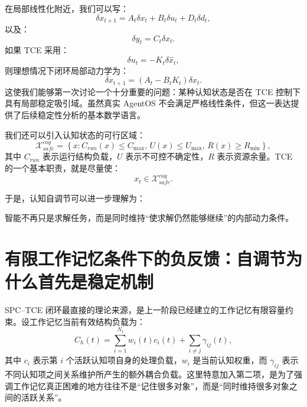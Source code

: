 在局部线性化附近，我们可以写：
\begin{equation}
\delta x_{t+1}
=
A_t\delta x_t
+
B_t\delta u_t
+
D_t\delta d_t,
\end{equation}
以及：
\begin{equation}
\delta y_t
=
C_t\delta x_t.
\end{equation}
如果 TCE 采用：
\begin{equation}
\delta u_t
=
-K_t\delta\hat{x}_t,
\end{equation}
则理想情况下闭环局部动力学为：
\begin{equation}
\delta x_{t+1}
=
(A_t-B_tK_t)
\delta x_t.
\end{equation}
这使我们能够第一次讨论一个十分重要的问题：某种认知状态是否在 TCE 控制下具有局部稳定吸引域。虽然真实 AgentOS 不会满足严格线性条件，但这一表达提供了后续稳定性分析的基本数学语言。

我们还可以引入认知状态的可行区域：
\begin{equation}
\mathcal X_{safe}^{cog}
=
\left\{
x:
C_{run}(x)\le C_{\max},
\,
U(x)\le U_{\max},
\,
R(x)\ge R_{\min}
\right\},
\end{equation}
其中 $C_{run}$ 表示运行结构负载，$U$ 表示不可控不确定性，$R$ 表示资源余量。TCE 的一个基本职责，就是尽量使：
\begin{equation}
x_t\in\mathcal X_{safe}^{cog}.
\end{equation}

于是，认知自调节可以进一步理解为：
\begin{statementbox}
\centering
{}
\end{statementbox}
智能不再只是求解任务，而是同时维持``使求解仍然能够继续''的内部动力条件。

\section{有限工作记忆条件下的负反馈：自调节为什么首先是稳定机制}

SPC--TCE 闭环最直接的理论来源，是上一阶段已经建立的工作记忆有限容量约束。设工作记忆当前有效结构负载为：
\begin{equation}
C_h(t)
=
\sum_{i=1}^{N_t}
w_i(t)c_i(t)
+
\sum_{i\neq j}
\gamma_{ij}(t),
\label{eq:working-memory-structural-load}
\end{equation}
其中 $c_i$ 表示第 $i$ 个活跃认知项自身的处理负载，$w_i$ 是当前认知权重，而 $\gamma_{ij}$ 表示不同认知项之间关系维护所产生的额外耦合负载。这里特意加入第二项，是为了强调工作记忆真正困难的地方往往不是``记住很多对象''，而是``同时维持很多对象之间的活跃关系''。

